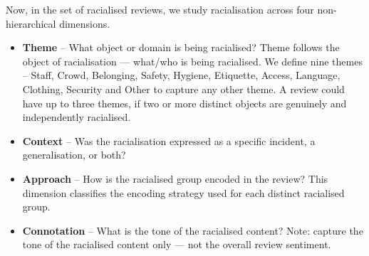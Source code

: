 Now, in the set of racialised reviews, we study racialisation across four non-hierarchical dimensions.
\begin{itemize}
    \item \textbf{Theme} -- What object or domain is being racialised? Theme follows the object of racialisation --- what/who is being racialised. We define nine themes -- Staff, Crowd, Belonging, Safety, Hygiene, Etiquette, Access, Language, Clothing, Security and Other to capture any other theme. A review could have up to three themes, if two or more distinct objects are genuinely and independently racialised.
    \item \textbf{Context} -- Was the racialisation expressed as a specific incident, a generalisation, or both?
    \item \textbf{Approach} -- How is the racialised group encoded in the review? This dimension classifies the encoding strategy used for each distinct racialised group.
    \item \textbf{Connotation} -- What is the tone of the racialised content? Note: capture the tone of the racialised content only --- not the overall review sentiment.
\end{itemize}

